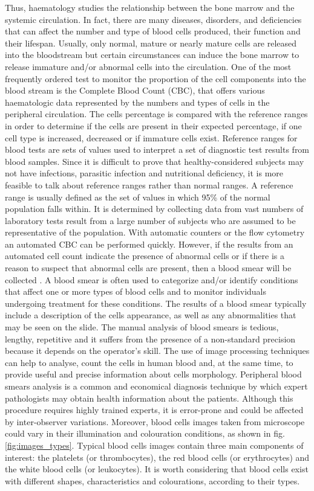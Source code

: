 \documentclass[sensors,review,submit,moreauthors,pdftex,10pt,a4paper]{mdpi}
\begin{document}
	Thus, haematology studies the relationship between the bone marrow and the systemic circulation. In fact, there are many diseases, disorders, and deficiencies that can affect the number and type of blood cells produced, their function and their lifespan. Usually, only normal, mature or nearly mature cells are released into the bloodstream but certain circumstances can induce the bone marrow to release immature and/or abnormal cells into the circulation. One of the most frequently ordered test to monitor the proportion of the cell components into the blood stream is the Complete Blood Count (CBC), that offers various haematologic data represented by the numbers and types of cells in the peripheral circulation. The cells percentage is compared with the reference ranges in order to determine if the cells are present in their expected percentage, if one cell type is increased, decreased or if immature cells exist. Reference ranges for blood tests are sets of values used to interpret a set of diagnostic test results from blood samples. Since it is difficult to prove that healthy-considered subjects may not have infections, parasitic infection and nutritional deficiency, it is more feasible to talk about reference ranges rather than normal ranges. A reference range is usually defined as the set of values in which 95\% of the normal population falls within. It is determined by collecting data from vast numbers of laboratory tests result from a large number of subjects who are assumed to be representative of the population. With automatic counters or the flow cytometry an automated CBC can be performed quickly. However, if the results from an automated cell count indicate the presence of abnormal cells or if there is a reason to suspect that abnormal cells are present, then a blood smear will be collected \cite{Loddo2016}. A blood smear is often used to categorize and/or identify conditions that affect one or more types of blood cells and to monitor individuals undergoing treatment for these conditions. The results of a blood smear typically include a description of the cells appearance, as well as any abnormalities that may be seen on the slide. The manual analysis of blood smears is tedious, lengthy, repetitive and it suffers from the presence of a non-standard precision because it depends on the operator's skill. The use of image processing techniques can help to analyse, count the cells in human blood and, at the same time, to provide useful and precise information about cells morphology.
	Peripheral blood smears analysis is a common and economical diagnosis technique by which expert pathologists may obtain health information about the patients. Although this procedure requires highly trained experts, it is error-prone and could be affected by inter-observer variations. Moreover, blood cells images taken from microscope could vary in their illumination and colouration conditions, as shown in fig. \ref{fig:images_types}. Typical blood cells images contain three main components of interest: the platelets (or thrombocytes), the red blood cells (or erythrocytes) and the white blood cells (or leukocytes). It is worth considering that blood cells exist with different shapes, characteristics and colourations, according to their types.
\end{document}
